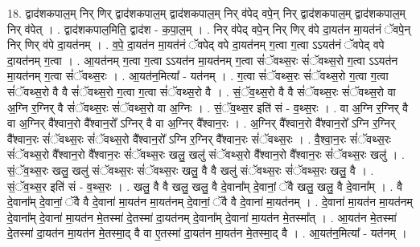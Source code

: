 \documentclass[17pt]{extarticle}
\begin{document}
18. द्वाद॑शकपाल॒म् निर् णिर् द्वाद॑शकपाल॒म् द्वाद॑शकपाल॒म् निर् व॑पेद् वपे॒न् निर् द्वाद॑शकपाल॒म् द्वाद॑शकपाल॒म् निर् व॑पेत् । . द्वाद॑शकपाल॒मिति॒ द्वाद॑श - क॒पा॒ल॒म् । . निर् व॑पेद् वपे॒न् निर् णिर् व॑पे दा॒यत॑न मा॒यत॑नं ॅवपे॒न् निर् णिर् व॑पे दा॒यत॑नम् । . व॒पे॒ दा॒यत॑न मा॒यत॑नं ॅवपेद् वपे दा॒यत॑नम् ग॒त्वा ग॒त्वा ऽऽयत॑नं ॅवपेद् वपे दा॒यत॑नम् ग॒त्वा । . आ॒यत॑नम् ग॒त्वा ग॒त्वा ऽऽयत॑न मा॒यत॑नम् ग॒त्वा सं॑ॅवथ्स॒रः सं॑ॅवथ्स॒रो ग॒त्वा ऽऽयत॑न मा॒यत॑नम् ग॒त्वा सं॑ॅवथ्स॒रः । . आ॒यत॑न॒मित्या᳚ - यत॑नम् । . ग॒त्वा सं॑ॅवथ्स॒रः सं॑ॅवथ्स॒रो ग॒त्वा ग॒त्वा सं॑ॅवथ्स॒रो वै वै सं॑ॅवथ्स॒रो ग॒त्वा ग॒त्वा सं॑ॅवथ्स॒रो वै । . सं॒ॅव॒थ्स॒रो वै वै सं॑ॅवथ्स॒रः सं॑ॅवथ्स॒रो वा अ॒ग्नि र॒ग्निर् वै सं॑ॅवथ्स॒रः सं॑ॅवथ्स॒रो वा अ॒ग्निः । . सं॒ॅव॒थ्स॒र इति॑ सं - व॒थ्स॒रः । . वा अ॒ग्नि र॒ग्निर् वै वा अ॒ग्निर् वै᳚श्वान॒रो वै᳚श्वान॒रो᳚ ऽग्निर् वै वा अ॒ग्निर् वै᳚श्वान॒रः । . अ॒ग्निर् वै᳚श्वान॒रो वै᳚श्वान॒रो᳚ ऽग्नि र॒ग्निर् वै᳚श्वान॒रः सं॑ॅवथ्स॒रः सं॑ॅवथ्स॒रो वै᳚श्वान॒रो᳚ ऽग्नि र॒ग्निर् वै᳚श्वान॒रः सं॑ॅवथ्स॒रः । . वै॒श्वा॒न॒रः सं॑ॅवथ्स॒रः सं॑ॅवथ्स॒रो वै᳚श्वान॒रो वै᳚श्वान॒रः सं॑ॅवथ्स॒रः खलु॒ खलु॑ संॅवथ्स॒रो वै᳚श्वान॒रो वै᳚श्वान॒रः सं॑ॅवथ्स॒रः खलु॑ । . सं॒ॅव॒थ्स॒रः खलु॒ खलु॑ संॅवथ्स॒रः सं॑ॅवथ्स॒रः खलु॒ वै वै खलु॑ संॅवथ्स॒रः सं॑ॅवथ्स॒रः खलु॒ वै । . सं॒ॅव॒थ्स॒र इति॑ सं - व॒थ्स॒रः । . खलु॒ वै वै खलु॒ खलु॒ वै दे॒वाना᳚म् दे॒वानां॒ ॅवै खलु॒ खलु॒ वै दे॒वाना᳚म् । . वै दे॒वाना᳚म् दे॒वानां॒ ॅवै वै दे॒वाना॑ मा॒यत॑न मा॒यत॑नम् दे॒वानां॒ ॅवै वै दे॒वाना॑ मा॒यत॑नम् । . दे॒वाना॑ मा॒यत॑न मा॒यत॑नम् दे॒वाना᳚म् दे॒वाना॑ मा॒यत॑न मे॒तस्मा॑ दे॒तस्मा॑ दा॒यत॑नम् दे॒वाना᳚म् दे॒वाना॑ मा॒यत॑न मे॒तस्मा᳚त् । . आ॒यत॑न मे॒तस्मा॑ दे॒तस्मा॑ दा॒यत॑न मा॒यत॑न मे॒तस्मा॒द् वै वा ए॒तस्मा॑ दा॒यत॑न मा॒यत॑न मे॒तस्मा॒द् वै । . आ॒यत॑न॒मित्या᳚ - यत॑नम् । \newline
\end{document}
